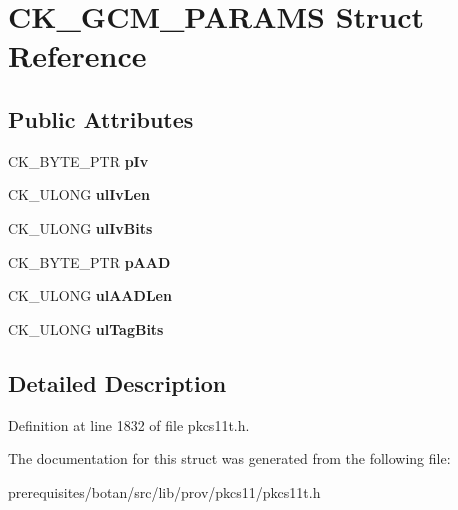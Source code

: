 \hypertarget{struct_c_k___g_c_m___p_a_r_a_m_s}{}\section{C\+K\+\_\+\+G\+C\+M\+\_\+\+P\+A\+R\+A\+MS Struct Reference}
\label{struct_c_k___g_c_m___p_a_r_a_m_s}
\subsection*{Public Attributes}
\begin{DoxyCompactItemize}
\item 
\mbox{\label{struct_c_k___g_c_m___p_a_r_a_m_s_a2ae117e4b42765507cd93983023c03e7}} 
C\+K\+\_\+\+B\+Y\+T\+E\+\_\+\+P\+TR {\bfseries p\+Iv}
\item 
\mbox{\label{struct_c_k___g_c_m___p_a_r_a_m_s_a0a57c78c922886cc6d7260ab0acb61fe}} 
C\+K\+\_\+\+U\+L\+O\+NG {\bfseries ul\+Iv\+Len}
\item 
\mbox{\label{struct_c_k___g_c_m___p_a_r_a_m_s_a352dfd3bba0f63669a6ed6b5db76d1bc}} 
C\+K\+\_\+\+U\+L\+O\+NG {\bfseries ul\+Iv\+Bits}
\item 
\mbox{\label{struct_c_k___g_c_m___p_a_r_a_m_s_a61180a497f53ae8e4b3a26004480fa42}} 
C\+K\+\_\+\+B\+Y\+T\+E\+\_\+\+P\+TR {\bfseries p\+A\+AD}
\item 
\mbox{\label{struct_c_k___g_c_m___p_a_r_a_m_s_a89208fe03593cd0accfd1473667b02a3}} 
C\+K\+\_\+\+U\+L\+O\+NG {\bfseries ul\+A\+A\+D\+Len}
\item 
\mbox{\label{struct_c_k___g_c_m___p_a_r_a_m_s_ae7009f51a60119f22340ca063291528c}} 
C\+K\+\_\+\+U\+L\+O\+NG {\bfseries ul\+Tag\+Bits}
\end{DoxyCompactItemize}


\subsection{Detailed Description}


Definition at line 1832 of file pkcs11t.\+h.



The documentation for this struct was generated from the following file\+:\begin{DoxyCompactItemize}
\item 
prerequisites/botan/src/lib/prov/pkcs11/pkcs11t.\+h\end{DoxyCompactItemize}
